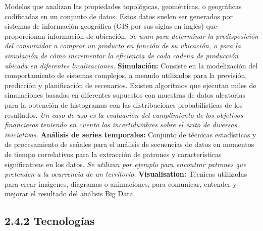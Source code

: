 \documentclass[
  letterpaper,
  DIV=11,
  numbers=noendperiod]{scrreprt}
\begin{document}
Modelos que analizan las propiedades topológicas, geométricas, o
geográficas codificadas en un conjunto de datos. Estos datos suelen ser
generados por sistemas de información geográfica (GIS por sus siglas en
inglés) que proporcionan información de ubicación. \emph{Se usan para
determinar la predisposición del consumidor a comprar un producto en
función de su ubicación, o para la simulación de cómo incrementar la
eficiencia de cada cadena de producción ubicada en diferentes
localizaciones.} \textbf{Simulación:} Consiste en la modelización del
comportamiento de sistemas complejos, a menudo utilizados para la
previsión, predicción y planificación de escenarios. Existen algoritmos
que ejecutan miles de simulaciones basadas en diferentes supuestos con
muestras de datos aleatorias para la obtención de histogramas con las
distribuciones probabilísticas de los resultados. \emph{Un caso de uso
es la evaluación del cumplimiento de los objetivos financieros teniendo
en cuenta las incertidumbres sobre el éxito de diversas iniciativas.}
\textbf{Análisis de series temporales:} Conjunto de técnicas
estadísticas y de procesamiento de señales para el análisis de
secuencias de datos en momentos de tiempo correlativos para la
extracción de patrones y características significativas en los datos.
\emph{Se utilizan por ejemplo para encontrar patrones que pretenden a la
ocurrencia de un territorio.} \textbf{Visualisation:} Técnicas
utilizadas para crear imágenes, diagramas o animaciones, para comunicar,
entender y mejorar el resultado del análisis Big Data.

\hypertarget{tecnologuxedas-1}{%
\subsection{2.4.2 Tecnologías}\label{tecnologuxedas-1}}
\end{document}
